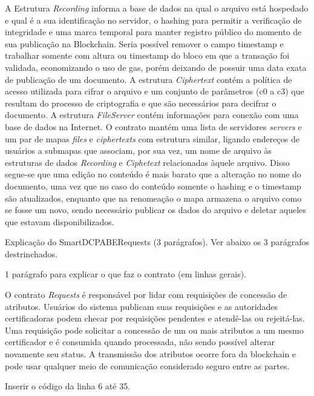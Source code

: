 \documentclass[a4paper,11pt]{article}
\begin{document}
A Estrutura \emph{Recording} informa a base de dados na qual o arquivo está hospedado e qual é a sua identificação no servidor, o hashing para permitir a verificação de integridade e uma marca temporal para manter registro público do momento de sua publicação na Blockchain. Seria possível remover o campo timestamp e trabalhar somente com altura ou timestamp do bloco em que a transação foi validada, economizando o uso de gas, porém deixando de possuir uma data exata de publicação de um documento. A estrutura \emph{Ciphertext} contém a política de acesso utilizada para cifrar o arquivo e um conjunto de parâmetros (c0 a c3) que resultam do processo de criptografia e que são necessários para decifrar o documento. A estrutura \emph{FileServer} contém informações para conexão com uma base de dados na Internet. O contrato mantém uma lista de servidores \emph{servers} e um par de mapas \emph{files} e \emph{ciphertexts} com estrutura similar, ligando endereços de usuários a submapas que associam, por sua vez, um nome de arquivo às estruturas de dados \emph{Recording} e \emph{Ciphetext} relacionadas àquele arquivo. Disso segue-se que uma edição no conteúdo é mais barato que a alteração no nome do documento, uma vez que no caso do conteúdo somente o hashing e o timestamp são atualizados, enquanto que na renomeação o mapa armazena o arquivo como se fosse um novo, sendo necessário publicar os dados do arquivo e deletar aqueles que estavam disponibilizados.

{\color{ForestGreen} Explicação do  SmartDCPABERequests  (3 parágrafos). Ver abaixo os 3 parágrafos destrinchados.}

{\color{Magenta} 1 parágrafo para explicar o que faz o contrato (em linhas gerais).}

O contrato \emph{Requests} é responsável por lidar com requisições de concessão de atributos.
Usuários do sistema publicam suas requisições e as autoridades certificadoras podem checar por requisições pendentes e atendê-las ou rejeitá-las.
Uma requisição pode solicitar a concessão de um ou mais atributos a um mesmo certificador e é consumida quando processada, não sendo possível alterar novamente seu status.
A transmissão dos atributos ocorre fora da blockchain e pode usar qualquer meio de comunicação considerado seguro entre as partes.

{\color{Magenta} Inserir o código da linha 6 até 35.}
\end{document}
